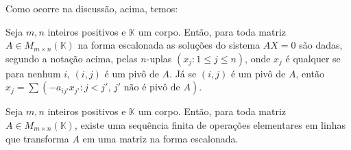 Como ocorre na discussão, acima, temos:

\begin{theorem}
    Seja $m, n$ inteiros positivos e $\mathbb K$ um corpo.
    Então, para toda matriz $A\in M_{m \times n}(\mathbb K)$ na forma escalonada as soluções do sistema $AX=0$ são dadas, segundo a notação acima, pelas $n$-uplas
    $(x_j: 1\leq j\leq n)$, onde $x_j$ é qualquer se para nenhum $i$, $(i, j)$ é um pivô de $A$.
    Já se $(i, j)$ é um pivô de $A$, então $x_j=\sum\left(-a_{ij'}x_{j'}: j<j',\, j' \text{ não é pivô de } A\right)$.
\end{theorem}

\begin{theorem}
    Seja $m, n$ inteiros positivos e $\mathbb K$ um corpo.
    Então, para toda matriz $A\in M_{m \times n}(\mathbb K)$, existe uma sequência finita de operações elementares em linhas que transforma $A$ em uma matriz na forma escalonada.
\end{theorem}
